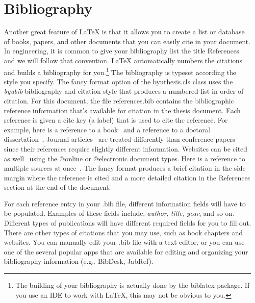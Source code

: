 \section{Bibliography}
Another great feature of \LaTeX{} is that it allows you to create a list or database of books, papers, and other documents that you can easily cite in your document. In engineering, it is common to give your bibliography list the title References and we will follow that convention. \LaTeX{} automatically numbers the citations and builds a bibliography for you.\footnote{The building of your bibliography is actually done by the {\ttfamily biblatex} package. If you use an IDE to work with \LaTeX, this may not be obvious to you.} The bibliography is typeset according the style you specify. The fancy format option of the {\ttfamily byuthesis.cls} class uses the {\em byubib} bibliography and citation style that produces a numbered list in order of citation. For this document, the file {\ttfamily references.bib} contains the bibliographic reference information that's available for citation in the thesis document. Each reference is given a cite key (a label) that is used to cite the reference. For example, here is a reference to a book~ and a reference to a doctoral dissertation~. Journal articles~ are treated differently than conference papers~ since their references require slightly different information. Websites can be cited as well~ using the {\ttfamily @online} or {\ttfamily @electronic} document types. Here is a reference to multiple sources at once~. The fancy format produces a brief citation in the side margin where the reference is cited and a more detailed citation in the References section at the end of the document.

For each reference entry in your {\ttfamily .bib} file, different information fields will have to be populated. Examples of these fields include, {\em author}, {\em title}, {\em year}, and so on. Different types of publications will have different required fields for you to fill out. There are other types of citations that you may use, such as book chapters and websites. You can manually edit your {\ttfamily .bib} file with a text editor, or you can use one of the several popular apps that are available for editing and organizing your bibliography information (e.g., BibDesk, JabRef).

